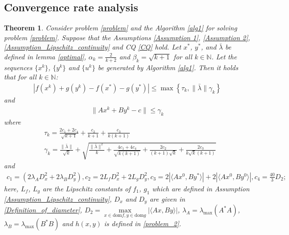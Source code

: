 \documentclass{article}
\numberwithin{equation}{section}
\newtheorem{theorem}{Theorem}[section]
\begin{document}
\subsection{Convergence rate analysis}
\begin{theorem} \label{theorem_convergence_Lipschitz}
    Consider problem \eqref{problem} and the Algorithm \ref{alg1} for solving problem \eqref{problem}. 
    Suppose that the Assumptions \ref{Assumption 1}, \ref{Assumption 2}, \ref{Assumption_Lipschitz_continuity} 
    and CQ \eqref{CQ} hold. Let $x^*$, $y^*$, and $\bar{\lambda}$ be defined in lemma \ref{optimal}, 
    $\alpha_k=\frac{2}{k+2}$ and $\beta_{k} =\sqrt{k+1}$ for all $k\in \mathbb{N}$. 
    Let the sequences $\{x^k\}$, $\{y^k\}$ and $\{u^k\}$ be generated by Algorithm \ref{alg1}. 
    Then it holds that for all $k\in \mathbb{N}$:
    \begin{align}
        \left|f(x^{k}) + g(y^{k})  - f(x^*) -g(y^*) \right| 
        \leq \max\left\{ \tau_k, \|\bar{\lambda} \rVert \gamma_k \right\}
    \end{align}
    and 
    \begin{align}
        \| Ax^k +By^k-c \rVert \leq \gamma_k
    \end{align}
    where
    \begin{align}
        &\tau_k=\frac{2c_1+2c_4}{\sqrt{k+1}} +\frac{c_2}{k+1}+ \frac{c_3}{k(k+1)} \nonumber \\
        &\gamma_k =\frac{\|\bar{\lambda}\rVert}{\sqrt{k}}+ \sqrt{\frac{\|\bar{\lambda}\rVert^2}{k}+\frac{4c_1+4c_4}{\sqrt{k(k+1)}} 
        +\frac{2c_2}{(k+1)\sqrt{k}}+ \frac{2c_3}{k\sqrt{k}(k+1)}} \nonumber 
    \end{align}
    and
    \begin{align}
        c_1= (2\lambda_{A} D_x^2+ 2\lambda_{B} D_y^2), c_2=2L_fD_x^2+2L_gD_y^2, c_3=2|\langle Ax^0,By^*\rangle|+2\left|\langle Ax^0, By^0\rangle \right|, c_4 = \frac{40}{3}D_2;
        \nonumber
    \end{align}
    here, $L_f$, $L_g$ are the Lipschitz constants of $f_1$, $g_1$ which are defined in Assumption \ref{Assumption_Lipschitz_continuity}, 
    $D_x$ and $D_y$ are given in \eqref{Definition_of_diameter}, $D_2 = \max\limits_{x\in\mathrm{dom}f,y\in\mathrm{dom}g}\left| \langle Ax,By\rangle \right|$,   
    $\lambda_{A} =\lambda_{\max}(A^*A)$, $\lambda_{B} = \lambda_{\max}(B^*B)$ and $h(x,y)$ is defined in \eqref{problem_2}. 
\end{theorem}
\end{document}
